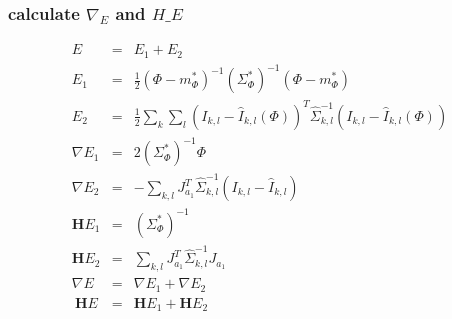 \documentclass[11pt]{article}
\begin{document}
\subsubsection{calculate $\nabla_{E}$ and $H\_E$}
\label{sec-1_2_11}

\begin{eqnarray}
\label{eq:3}
E & = & E_1 + E_2\\
E_1 &  = & \frac{1}{2}(\Phi -
m^{*}_{\Phi})^{-1}(\Sigma^{*}_{\Phi})^{-1}(\Phi - m^{*}_{\Phi}) \\
E_2 & = & \frac{1}{2} \sum_k\sum_l (I_{k,l} - \hat{I}_{k,l}(\Phi))^T
\hat{\Sigma}_{k,l}^{-1} (I_{k,l} - \hat{I}_{k,l}(\Phi))\\
\nabla{E_1} &= & 2(\Sigma_\Phi^*)^{-1}\Phi\\
\nabla{E_2} & = & -\sum_{k,l}J_{a_1}^T \hat{\Sigma}_{k,l}^{-1} (I_{k,l} -
\hat{I}_{k,l}) \\
\mathbf{H} E_{1} & = & (\Sigma_\Phi^*)^{-1}\\
\mathbf{H} E_{2} & = &\sum_{k,l} J_{a_1}^T \hat{\Sigma}_{k,l}^{-1} J_{a_1}\\
\nabla{E} &=& \nabla{E_1} +  \nabla{E_2}\\\
\mathbf{H} E &=& \mathbf{H} E_1 + \mathbf{H} E_2
\end{eqnarray}
\end{document}
